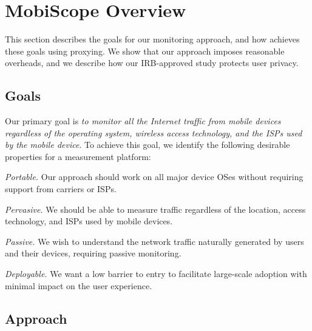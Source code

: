 \section{MobiScope Overview} 
\label{sec:platform} 

This section describes the goals for our monitoring approach, and how \platname achieves these goals using proxying. 
We show that our approach imposes reasonable overheads, and we describe how our IRB-approved 
study protects user privacy.

\subsection{Goals}  
\label{sec:goals} 
Our primary goal is \emph{to monitor all the Internet traffic from mobile devices regardless of the operating system, wireless access technology, and the ISPs used by the mobile device}. 
To achieve this goal, we identify the following desirable properties for a measurement platform: 
\begin{packedenumerate}
\item \emph{Portable.} Our approach should work on all major device OSes without requiring support from carriers or ISPs.  
\item \emph{Pervasive.} We should be able to measure traffic regardless of the location, access technology, and ISPs used by mobile devices. 
\item \emph{Passive.} We wish to understand the network traffic naturally generated by users and their devices, requiring passive monitoring.
\item \emph{Deployable.} We want a low barrier to entry to facilitate large-scale adoption with minimal impact on the user experience.
\end{packedenumerate}    


\subsection{Approach}
\label{sec:description}

